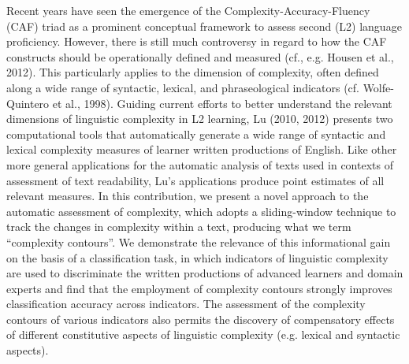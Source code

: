 \documentclass[10pt, a4paper, twopage, headinclude, footinclude, BCOR5mm]{scrartcl}
\begin{document}
        \begin{table}[t!]
    \end{table}
        \begin{table}[t!]
    \end{table}

\noindent
Recent years have seen the emergence of the Complexity-Accuracy-Fluency (CAF) triad as a prominent conceptual framework to assess second (L2) language proficiency. However, there is still much controversy in regard to how the CAF constructs should be operationally defined and measured (cf., e.g. Housen et al., 2012). This particularly applies to the dimension of complexity, often defined along a wide range of syntactic, lexical, and phraseological indicators (cf. Wolfe-Quintero et al., 1998). Guiding current efforts to better understand the relevant dimensions of linguistic complexity in L2 learning, Lu (2010, 2012) presents two computational tools that automatically generate a wide range of syntactic and lexical complexity measures of learner written productions of English. Like other more general applications for the automatic analysis of texts used in contexts of assessment of text readability, Lu’s applications produce point estimates of all relevant measures. In this contribution, we present a novel approach to the automatic assessment of complexity, which adopts a sliding-window technique to track the changes in complexity within a text, producing what we term “complexity contours”. We demonstrate the relevance of this informational gain on the basis of a classification task, in which indicators of linguistic complexity are used to discriminate the written productions of advanced learners and domain experts and find that the employment of complexity contours strongly improves classification accuracy across indicators. The assessment of the complexity contours of various indicators also permits the discovery of compensatory effects of different constitutive aspects of linguistic complexity (e.g. lexical and syntactic aspects).
\end{document}
